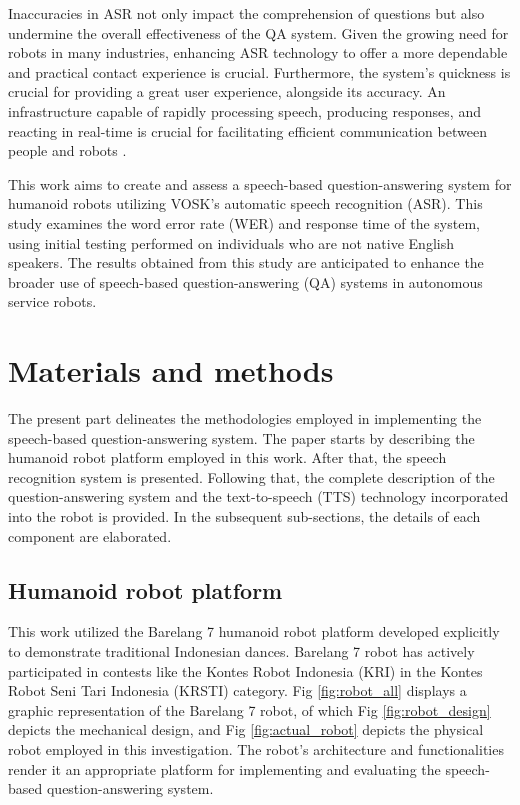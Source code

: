 \documentclass{../styles/svproc}
\begin{document}
Inaccuracies in ASR not only impact the comprehension of questions but also undermine the overall effectiveness of the QA system. Given the growing need for robots in many industries, enhancing ASR technology to offer a more dependable and practical contact experience is crucial. Furthermore, the system's quickness is crucial for providing a great user experience, alongside its accuracy. An infrastructure capable of rapidly processing speech, producing responses, and reacting in real-time is crucial for facilitating efficient communication between people and robots \cite{Fukumori2022-ni}.

This work aims to create and assess a speech-based question-answering system for humanoid robots utilizing VOSK's automatic speech recognition (ASR). This study examines the word error rate (WER) and response time of the system, using initial testing performed on individuals who are not native English speakers. The results obtained from this study are anticipated to enhance the broader use of speech-based question-answering (QA) systems in autonomous service robots.

\section{Materials and methods}
The present part delineates the methodologies employed in implementing the speech-based question-answering system. The paper starts by describing the humanoid robot platform employed in this work. After that, the speech recognition system is presented. Following that, the complete description of the question-answering system and the text-to-speech (TTS) technology incorporated into the robot is provided. In the subsequent sub-sections, the details of each component are elaborated.

\subsection{Humanoid robot platform}
This work utilized the Barelang 7 humanoid robot platform developed explicitly to demonstrate traditional Indonesian dances. Barelang 7 robot has actively participated in contests like the Kontes Robot Indonesia (KRI) in the Kontes Robot Seni Tari Indonesia (KRSTI) category. Fig \ref{fig:robot_all} displays a graphic representation of the Barelang 7 robot, of which Fig \ref{fig:robot_design} depicts the mechanical design, and Fig \ref{fig:actual_robot} depicts the physical robot employed in this investigation. The robot's architecture and functionalities render it an appropriate platform for implementing and evaluating the speech-based question-answering system.
\end{document}
